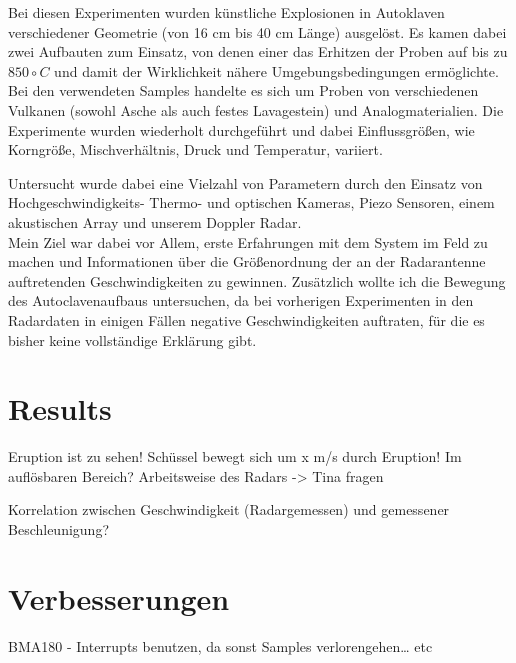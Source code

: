\documentclass[12pt,a4paper]{scrartcl}
\begin{document}
Bei diesen Experimenten wurden künstliche Explosionen in Autoklaven \citep{Spieler:2004fk} verschiedener Geometrie (von 16 cm bis 40 cm Länge) ausgelöst. Es kamen dabei zwei Aufbauten zum Einsatz, von denen einer das Erhitzen der Proben auf bis zu $850\circ C$ und damit der Wirklichkeit nähere Umgebungsbedingungen ermöglichte. Bei den verwendeten Samples handelte es sich um Proben von verschiedenen Vulkanen (sowohl Asche als auch festes Lavagestein) und Analogmaterialien.
Die Experimente wurden wiederholt durchgeführt und dabei Einflussgrößen, wie Korngröße, Mischverhältnis, Druck und Temperatur, variiert.

Untersucht wurde dabei eine Vielzahl von Parametern durch den Einsatz von Hochgeschwindigkeits- Thermo- und optischen Kameras, Piezo Sensoren, einem akustischen Array und unserem Doppler Radar.\\

Mein Ziel war dabei vor Allem, erste Erfahrungen mit dem System im Feld zu machen und Informationen über die Größenordnung der an der Radarantenne auftretenden Geschwindigkeiten zu gewinnen. Zusätzlich wollte ich die Bewegung des Autoclavenaufbaus untersuchen, da bei vorherigen Experimenten in den Radardaten in einigen Fällen negative Geschwindigkeiten auftraten, für die es bisher keine vollständige Erklärung gibt. 



\section{Results}

Eruption ist zu sehen!
Schüssel bewegt sich um x m/s durch Eruption! Im auflösbaren Bereich? Arbeitsweise des Radars -> Tina fragen

Korrelation zwischen Geschwindigkeit (Radargemessen) und gemessener Beschleunigung?

\section{Verbesserungen}

BMA180 - Interrupts benutzen, da sonst Samples verlorengehen… etc


\clearpage
\newpage
\appendix


\end{document}
